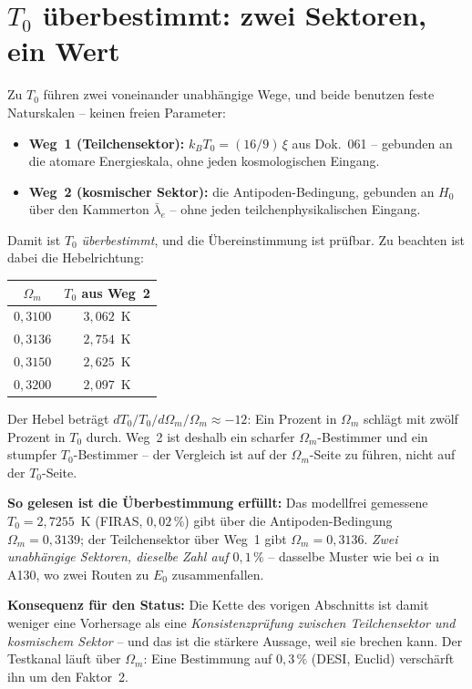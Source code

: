 \documentclass[11pt]{report}
\begin{document}
\section{$T_0$ überbestimmt: zwei Sektoren, ein Wert}

Zu $T_0$ führen zwei voneinander unabhängige Wege, und beide
benutzen feste Naturskalen -- keinen freien Parameter:

\begin{itemize}
  \item \textbf{Weg~1 (Teilchensektor):} $k_BT_0 = (16/9)\,\xi$
        aus Dok.~061 -- gebunden an die atomare Energieskala,
        ohne jeden kosmologischen Eingang.
  \item \textbf{Weg~2 (kosmischer Sektor):} die
        Antipoden-Bedingung, gebunden an $H_0$ über den Kammerton
        $\bar\lambda_e$ -- ohne jeden teilchenphysikalischen
        Eingang.
\end{itemize}

\noindent Damit ist $T_0$ \emph{überbestimmt}, und die
Übereinstimmung ist prüfbar. Zu beachten ist dabei die
Hebelrichtung:

\begin{center}
\begin{tabular}{cc}
\toprule
$\Omega_m$ & $T_0$ aus Weg~2 \\
\midrule
$0{,}3100$ & $3{,}062$~K \\
$0{,}3136$ & $2{,}754$~K \\
$0{,}3150$ & $2{,}625$~K \\
$0{,}3200$ & $2{,}097$~K \\
\bottomrule
\end{tabular}
\end{center}

\noindent Der Hebel beträgt $dT_0/T_0 \big/ d\Omega_m/\Omega_m
\approx -12$: Ein Prozent in $\Omega_m$ schlägt mit zwölf Prozent
in $T_0$ durch. Weg~2 ist deshalb ein scharfer
$\Omega_m$-Bestimmer und ein stumpfer $T_0$-Bestimmer -- der
Vergleich ist auf der $\Omega_m$-Seite zu führen, nicht auf der
$T_0$-Seite.

\textbf{So gelesen ist die Überbestimmung erfüllt:} Das
modellfrei gemessene $T_0 = 2{,}7255$~K (FIRAS, $0{,}02\,\%$) gibt
über die Antipoden-Bedingung $\Omega_m = 0{,}3139$; der
Teilchensektor über Weg~1 gibt $\Omega_m = 0{,}3136$. \emph{Zwei
unabhängige Sektoren, dieselbe Zahl auf $0{,}1\,\%$} -- dasselbe
Muster wie bei $\alpha$ in A130, wo zwei Routen zu $E_0$
zusammenfallen.

\textbf{Konsequenz für den Status:} Die Kette des vorigen
Abschnitts ist damit weniger eine Vorhersage als eine
\emph{Konsistenzprüfung zwischen Teilchensektor und kosmischem
Sektor} -- und das ist die stärkere Aussage, weil sie brechen
kann. Der Testkanal läuft über $\Omega_m$: Eine Bestimmung auf
$0{,}3\,\%$ (DESI, Euclid) verschärft ihn um den Faktor~2.
\end{document}
